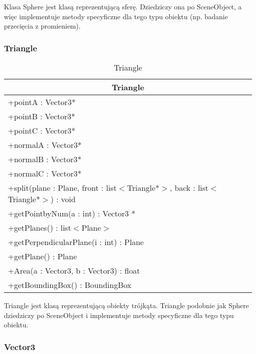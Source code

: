 Klasa Sphere jest klasą reprezentującą sferę. Dziedziczy ona po SceneObject, a więc implementuje metody specyficzne dla tego typu obiektu (np. badanie przecięcia z promieniem).

\subsubsection{Triangle}

\footnotesize
\begin{longtable}{|p{14cm}|}
    \caption{Triangle} \label{tab:Triangle} \\ \hline
    \multicolumn{1}{|c|}{Triangle} \\ \hline
    +pointA : Vector3* \\
    +pointB : Vector3* \\
    +pointC : Vector3* \\
    +normalA : Vector3* \\
    +normalB : Vector3* \\
    +normalC : Vector3* \\
    \hline
	+split(plane : Plane, front : list$<$Triangle*$>$, back : list$<$Triangle*$>$) : void \\ 
	+getPointbyNum(a : int) : Vector3 * \\
	+getPlanes() : list$<$Plane$>$ \\
	+getPerpendicularPlane(i : int) : Plane \\
	+getPlane() : Plane \\
	+Area(a : Vector3, b : Vector3) : float \\
	+getBoundingBox() : BoundingBox \\
	\hline
\end{longtable}
\normalsize

Triangle jest klasą reprezentującą obiekty trójkąta. Triangle podobnie jak Sphere dziedziczy po SceneObject i implementuje metody specyficzne dla tego typu obiektu.

\subsubsection{Vector3}

